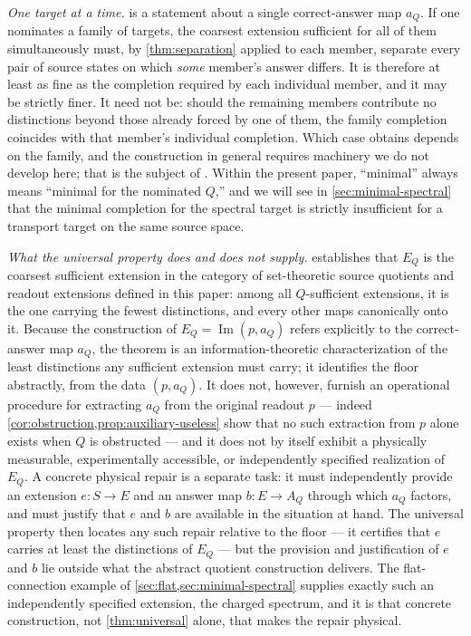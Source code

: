 \documentclass[11pt,reqno]{amsart}
\theoremstyle{plain}
\theoremstyle{definition}
\newcommand{\Src}{S}
\newcommand{\Img}{\operatorname{Im}}
\begin{document}
\emph{One target at a time.}  is a statement about a single correct-answer map
$a_Q$. If one nominates a family of targets, the coarsest extension sufficient for all of them
simultaneously must, by \cref{thm:separation} applied to each member, separate every pair of source
states on which \emph{some} member's answer differs. It is therefore at least as fine as the
completion required by each individual member, and it may be strictly finer. It need not be:
should the remaining members contribute no distinctions beyond those already forced by one of
them, the family completion coincides with that member's individual completion. Which case obtains
depends on the family, and the construction in general requires machinery we do not develop here;
that is the subject of \cite{ShadowIII}. Within the present paper, ``minimal'' always
means ``minimal for the nominated $Q$,'' and we will see in \cref{sec:minimal-spectral} that the
minimal completion for the spectral target is strictly insufficient for a transport target on the
same source space.

\emph{What the universal property does and does not supply.}  establishes
that $E_Q$ is the coarsest sufficient extension in the category of set-theoretic source
quotients and readout extensions defined in this paper: among all $Q$-sufficient extensions, it
is the one carrying the fewest distinctions, and every other maps canonically onto it. Because
the construction of $E_Q=\Img(p,a_Q)$ refers explicitly to the correct-answer map $a_Q$, the
theorem is an information-theoretic characterization of the least distinctions any sufficient
extension must carry; it identifies the floor abstractly, from the data $(p,a_Q)$. It does not,
however, furnish an operational procedure for extracting $a_Q$ from the original readout $p$ ---
indeed \cref{cor:obstruction,prop:auxiliary-useless} show that no such extraction from $p$ alone
exists when $Q$ is obstructed --- and it does not by itself exhibit a physically measurable,
experimentally accessible, or independently specified realization of $E_Q$. A concrete physical
repair is a separate task: it must independently provide an extension $e\colon\Src\to E$ and an
answer map $b\colon E\to A_Q$ through which $a_Q$ factors, and must justify that $e$ and $b$ are
available in the situation at hand. The universal property then locates any such repair relative
to the floor --- it certifies that $e$ carries at least the distinctions of $E_Q$ --- but the
provision and justification of $e$ and $b$ lie outside what the abstract quotient construction
delivers. The flat-connection example of \cref{sec:flat,sec:minimal-spectral} supplies exactly
such an independently specified extension, the charged spectrum, and it is that concrete
construction, not \cref{thm:universal} alone, that makes the repair physical.
\end{document}
